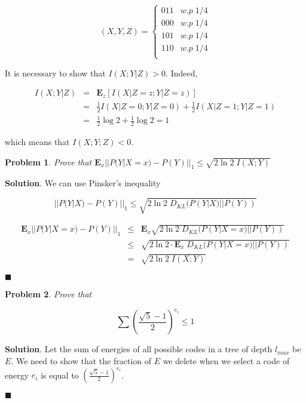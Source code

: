\documentclass[12pt]{article}
\newtheorem{p}{Problem}[section]
\theoremstyle{definition}
\newenvironment{s}{%
        \begin{trivlist} \item \textbf{Solution}. }{%
            \hspace*{\fill} $\blacksquare$\end{trivlist}}%
\begin{document}
{\[(X,Y,Z)= \begin{cases} 
      011 & w.p \; 1/4 \\
      000 & w.p \; 1/4 \\
      101 & w.p \; 1/4 \\
      110 & w.p \; 1/4 \\
   \end{cases}
\]

It is necessary to show that $I(X;Y|Z) > 0$. Indeed,

\begin{eqnarray*}
I(X;Y|Z) &=& \mathbf{E}_{z}[I(X|Z=z; Y|Z=z)]\\
&=& \frac{1}{2}I(X|Z=0; Y|Z=0) + \frac{1}{2}I(X|Z=1; Y|Z=1)\\
&=& \frac{1}{2}\log 2 + \frac{1}{2} \log 2 = 1
\end{eqnarray*}

which means that $I(X;Y;Z) < 0$.

\begin{p}
Prove that $\mathbf{E}_{x}||P(Y|X=x) - P(Y)||_{1} \leq \sqrt{2\ln 2 \;I(X;Y)}$
\end{p}

\begin{s}
We can use  Pinsker's inequality

\begin{equation*}
||P(Y|X)-P(Y)||_{1} \leq \sqrt{2\ln 2 \; D_{KL}(P(Y|X)||P(Y))}
\end{equation*}

\begin{eqnarray*}
\mathbf{E}_{x}||P(Y|X=x) - P(Y)||_{1} &\leq & \mathbf{E}_{x}\sqrt{2\ln 2 \;D_{KL}(P(Y|X=x)||P(Y))}\\
&\leq & \sqrt{2\ln 2 \cdot \mathbf{E}_{x}\; D_{KL}(P(Y|X=x)||P(Y))}\\
&=& \sqrt{2\ln 2 \;I(X;Y)}
\end{eqnarray*}

\end{s}

\begin{p}
Prove that 

\begin{equation*}
\sum (\frac{\sqrt{5}-1}{2})^{e_{i}} \leq 1
\end{equation*}

\end{p}

\begin{s}
Let the sum of energies of all possible codes in a tree of depth $l_{max}$ be $E$. We need to show that the fraction of $E$ we delete when we select a code of energy $e_{i}$ is equal to $(\frac{\sqrt{5}-1}{2})^{e_{i}}$.

\end{s}
\end{document}
